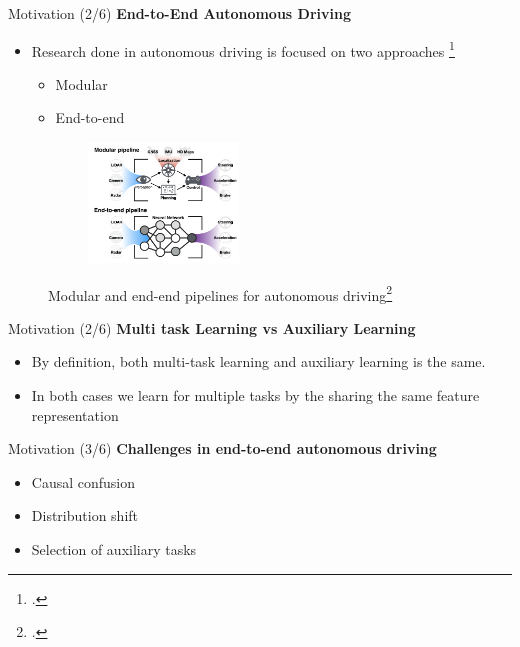 \documentclass[aspectratio=169]{beamer}
\begin{document}
\begin{frame}{Motivation (2/6)}
  \textbf{End-to-End Autonomous Driving}
  \begin{itemize}
    \item Research done in autonomous driving is focused on two approaches \footcite{DBLP:journals/corr/abs-2003-06404}
        \begin{itemize}
            \item Modular 
            \item End-to-end 
        \end{itemize}
        
  \end{itemize}
    \begin{figure}[H]
     \centering
     
\begin{subfigure}{\textwidth}
\includegraphics[width=0.4\linewidth, height=3.2cm]{images/end-modular.png} 
\label{fig:subim1}
\end{subfigure}

\caption{Modular and end-end pipelines for autonomous driving\footcite{DBLP:journals/corr/abs-2003-06404}}
\label{fig:image2}
\end{figure}
\end{frame}

\begin{frame}{Motivation (2/6)}
  \textbf{Multi task Learning vs Auxiliary Learning}

  \begin{itemize}
      \item By definition, both multi-task learning and auxiliary learning is the same. 
      \item In both cases we learn for multiple tasks by the sharing the same feature representation
  \end{itemize}
\end{frame}

\begin{frame}{Motivation (3/6)}
  \textbf{Challenges in end-to-end autonomous driving}

  \begin{itemize}
      \item Causal confusion
      \item Distribution shift 
      \item Selection of auxiliary tasks
  \end{itemize}
\end{frame}



\begin{frame}
\printbibliography
\end{frame}
\end{document}
